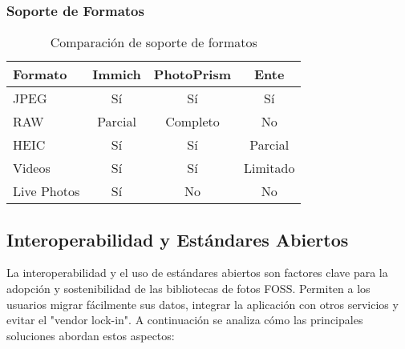 \subsubsection{Soporte de Formatos}

\begin{table}[H]
\centering
\begin{tabular}{|l|c|c|c|}
\hline
\textbf{Formato} & \textbf{Immich} & \textbf{PhotoPrism} & \textbf{Ente} \\
\hline
JPEG & Sí & Sí & Sí \\
RAW & Parcial & Completo & No \\
HEIC & Sí & Sí & Parcial \\
Videos & Sí & Sí & Limitado \\
Live Photos & Sí & No & No \\
\hline
\end{tabular}
\caption{Comparación de soporte de formatos}
\label{tab:format_support}
\end{table}

\subsection{Interoperabilidad y Estándares Abiertos}

La interoperabilidad y el uso de estándares abiertos son factores clave para la adopción y sostenibilidad de las bibliotecas de fotos FOSS. Permiten a los usuarios migrar fácilmente sus datos, integrar la aplicación con otros servicios y evitar el "vendor lock-in". A continuación se analiza cómo las principales soluciones abordan estos aspectos:

